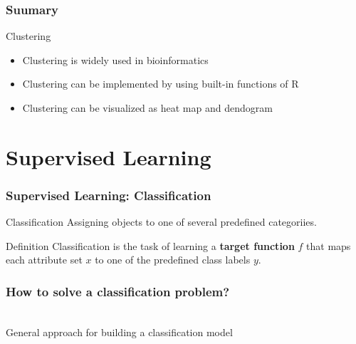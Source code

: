 \documentclass[UTF8]{beamer}\usepackage[]{graphicx}\usepackage[]{color}
\begin{document}
\begin{frame}[fragile]
  \frametitle{Suumary}
\begin{block}{Clustering}
  \begin{itemize}
  \item Clustering is widely used in bioinformatics
  \item Clustering can be implemented by using built-in functions of R
  \item Clustering can be visualized as heat map and dendogram
  \end{itemize}
\end{block}
\end{frame}


\section{Supervised Learning}

\begin{frame}
\frametitle{Supervised Learning: Classification}

\begin{block}{Classification}
Assigning objects to one of several predefined categoriies.
\end{block}


\begin{block}{Definition}
Classification is the task of learning a \textbf{target function} $f$ that maps each attribute set $x$ to one of the predefined class labels $y$.
\end{block}
\end{frame}


\begin{frame}
  \frametitle{How to solve a classification problem?}
\begin{center}
\\
General approach for building a classification model
\end{center}
\end{frame}
\end{document}
